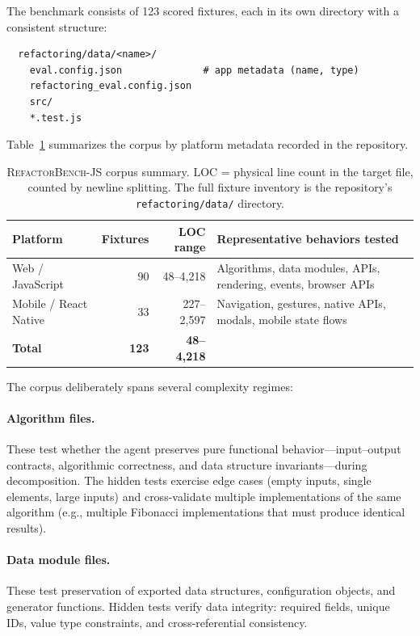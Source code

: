\documentclass[11pt,letterpaper]{article}
\begin{document}
The benchmark consists of 123 scored fixtures, each in its own directory with a consistent structure:

\begin{verbatim}
  refactoring/data/<name>/
    eval.config.json              # app metadata (name, type)
    refactoring_eval.config.json
    src/
    *.test.js
\end{verbatim}

Table~\ref{tab:corpus} summarizes the corpus by platform metadata recorded in the repository.

\begin{table}[ht]
\centering
\caption{\textsc{RefactorBench}-JS corpus summary. LOC = physical line count in the target file, counted by newline splitting. The full fixture inventory is the repository's \texttt{refactoring/data/} directory.}
\label{tab:corpus}
\small
\begin{tabularx}{\textwidth}{lrrX}
\toprule
\textbf{Platform} & \textbf{Fixtures} & \textbf{LOC range} & \textbf{Representative behaviors tested} \\
\midrule
Web / JavaScript & 90 & 48--4{,}218   & Algorithms, data modules, APIs, rendering, events, browser APIs \\
Mobile / React Native & 33 & 227--2{,}597 & Navigation, gestures, native APIs, modals, mobile state flows \\
\midrule
\textbf{Total}  & \textbf{123} & \textbf{48--4{,}218} & \\
\bottomrule
\end{tabularx}
\end{table}

The corpus deliberately spans several complexity regimes:

\paragraph{Algorithm files.} These test whether the agent preserves pure functional behavior---input--output contracts, algorithmic correctness, and data structure invariants---during decomposition. The hidden tests exercise edge cases (empty inputs, single elements, large inputs) and cross-validate multiple implementations of the same algorithm (e.g., multiple Fibonacci implementations that must produce identical results).

\paragraph{Data module files.} These test preservation of exported data structures, configuration objects, and generator functions. Hidden tests verify data integrity: required fields, unique IDs, value type constraints, and cross-referential consistency.
\end{document}
